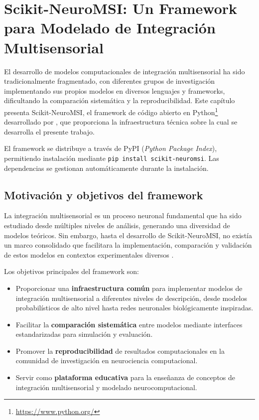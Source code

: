 \chapter{Scikit-NeuroMSI: Un Framework para Modelado de Integración Multisensorial}
\label{chapter:scikit_neuromsi}

El desarrollo de modelos computacionales de integración multisensorial ha sido tradicionalmente fragmentado, con diferentes grupos de investigación implementando sus propios modelos en diversos lenguajes y frameworks, dificultando la comparación sistemática y la reproducibilidad. Este capítulo presenta Scikit-NeuroMSI, el framework de código abierto en Python\footnote{\url{https://www.python.org/}} desarrollado por \citeauthor{paredes2025scikit}, que proporciona la infraestructura técnica sobre la cual se desarrolla el presente trabajo.

El framework se distribuye a través de PyPI (\textit{Python Package Index}), permitiendo instalación mediante \texttt{pip install scikit-neuromsi}. Las dependencias se gestionan automáticamente durante la instalación.


\section{Motivación y objetivos del framework}
\label{sec:snmsi_motivacion}

La integración multisensorial es un proceso neuronal fundamental que ha sido estudiado desde múltiples niveles de análisis, generando una diversidad de modelos teóricos. Sin embargo, hasta el desarrollo de Scikit-NeuroMSI, no existía un marco consolidado que facilitara la implementación, comparación y validación de estos modelos en contextos experimentales diversos \citep{paredes2025scikit}.

Los objetivos principales del framework son:

\begin{itemize}
\item Proporcionar una \textbf{infraestructura común} para implementar modelos de integración multisensorial a diferentes niveles de descripción, desde modelos probabilísticos de alto nivel hasta redes neuronales biológicamente inspiradas.

\item Facilitar la \textbf{comparación sistemática} entre modelos mediante interfaces estandarizadas para simulación y evaluación.

\item Promover la \textbf{reproducibilidad} de resultados computacionales en la comunidad de investigación en neurociencia computacional.

\item Servir como \textbf{plataforma educativa} para la enseñanza de conceptos de integración multisensorial y modelado neurocomputacional.
\end{itemize}


